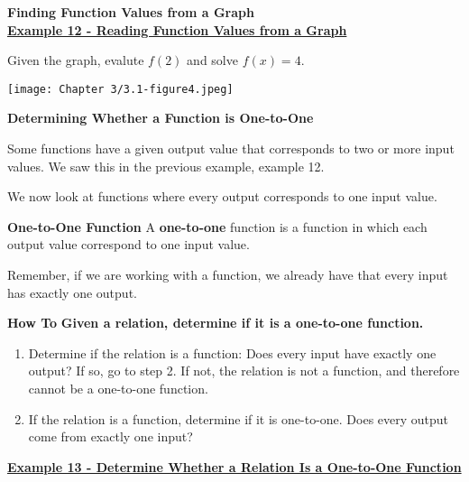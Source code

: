 \documentclass[12pt]{book}
\begin{document}
\textbf{Finding Function Values from a Graph}
\\

\underline{\textbf{Example 12 - Reading Function Values from a Graph}}

Given the graph, evalute $f(2)$ and solve $f(x)=4$.
\vspace{5mm}

\texttt{[image: Chapter 3/3.1-figure4.jpeg]}

\newpage

\textbf{Determining Whether a Function is One-to-One}

Some functions have a given output value that corresponds to two or more input values. We saw this in the previous example, example 12. 

We now look at functions where every output corresponds to one input value. 
\\

\begin{boxR}
   \textbf{ One-to-One Function}
    \vspace{1mm}
    \hline
    \vspace{2mm}
    A \textbf{one-to-one} function is a function in which each output value correspond to one input value.
\end{boxR}

Remember, if we are working with a function, we already have that every input has exactly one output. 
\\

\begin{boxR}
   \textbf{ How To}
   \vspace{1mm}
   \hline
   \vspace{2mm}
   \textbf{Given a relation, determine if it is a one-to-one function.}
   \begin{enumerate}
       \item Determine if the relation is a function: Does every input have exactly one output? If so, go to step 2. If not, the relation is not a function, and therefore cannot be a one-to-one function.
       \item If the relation is a function, determine if it is one-to-one. Does every output come from exactly one input?
   \end{enumerate}
\end{boxR}
\underline{\textbf{Example 13 - Determine Whether a Relation Is a One-to-One Function}}
\end{document}
